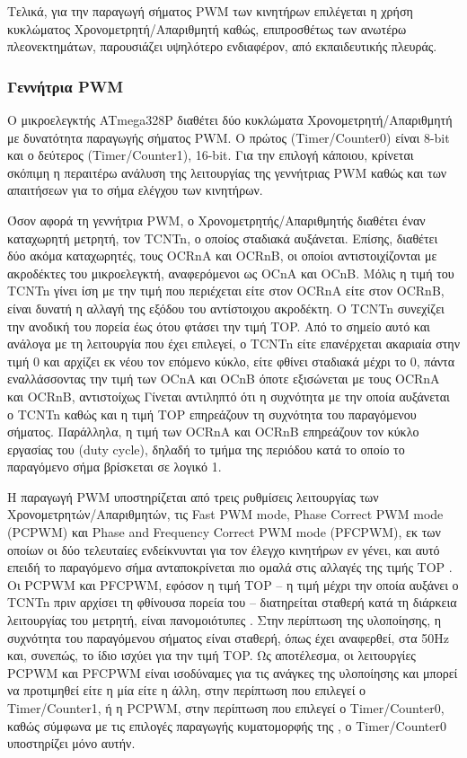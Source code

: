 Τελικά, για την παραγωγή σήματος PWM των κινητήρων επιλέγεται η χρήση κυκλώματος
Χρονομετρητή\slash Απαριθμητή καθώς, επιπροσθέτως των ανωτέρω πλεονεκτημάτων,
παρουσιάζει υψηλότερο ενδιαφέρον, από εκπαιδευτικής πλευράς.

\subsubsection{Γεννήτρια PWM}

Ο μικροελεγκτής ATmega328P διαθέτει δύο κυκλώματα Χρονομετρητή\slash Απαριθμητή
με δυνατότητα παραγωγής σήματος PWM. Ο πρώτος (Timer\slash Counter0) είναι 8-bit
και ο δεύτερος (Timer\slash Counter1), 16-bit. Για την επιλογή κάποιου, κρίνεται
σκόπιμη η περαιτέρω ανάλυση της λειτουργίας της γεννήτριας PWM καθώς και των
απαιτήσεων για το σήμα ελέγχου των κινητήρων.

Όσον αφορά τη γεννήτρια PWM, ο Χρονομετρητής\slash Απαριθμητής διαθέτει έναν
καταχωρητή μετρητή, τον TCNTn, ο οποίος σταδιακά αυξάνεται. Επίσης, διαθέτει
δύο ακόμα καταχωρητές, τους OCRnA και OCRnB, οι οποίοι αντιστοιχίζονται με
ακροδέκτες του μικροελεγκτή, αναφερόμενοι ως OCnA και OCnB. Μόλις η τιμή του
TCNTn γίνει ίση με την τιμή που περιέχεται είτε στον OCRnA είτε στον OCRnB,
είναι δυνατή η αλλαγή της εξόδου του αντίστοιχου ακροδέκτη. Ο TCNTn συνεχίζει
την ανοδική του πορεία έως ότου φτάσει την τιμή TOP. Από το σημείο αυτό και
ανάλογα με τη λειτουργία που έχει επιλεγεί, ο TCNTn είτε επανέρχεται ακαριαία
στην τιμή 0 και αρχίζει εκ νέου τον επόμενο κύκλο, είτε φθίνει σταδιακά μέχρι το
0, πάντα εναλλάσσοντας την τιμή των OCnA και OCnB όποτε εξισώνεται με τους OCRnA
και OCRnB, αντιστοίχως %
Γίνεται αντιληπτό ότι η συχνότητα με την οποία αυξάνεται ο TCNTn καθώς και η
τιμή TOP επηρεάζουν τη συχνότητα του παραγόμενου σήματος. Παράλληλα, η τιμή των
OCRnA και OCRnB επηρεάζουν τον κύκλο εργασίας του (\textenglish{duty cycle}),
δηλαδή το τμήμα της περιόδου κατά το οποίο το παραγόμενο σήμα βρίσκεται σε
λογικό 1.

Η παραγωγή PWM υποστηρίζεται από τρεις ρυθμίσεις λειτουργίας των
Χρονομετρητών\slash Απαριθμητών, τις \textenglish{Fast PWM mode, Phase Correct
PWM mode (PCPWM)} και \textenglish{Phase and Frequency Correct PWM mode
(PFCPWM)}, εκ των οποίων οι δύο τελευταίες ενδείκνυνται για τον έλεγχο κινητήρων
εν γένει, και αυτό επειδή το παραγόμενο σήμα ανταποκρίνεται πιο ομαλά στις
αλλαγές της τιμής TOP \parencite[126,128]{atmel13}. Οι PCPWM και PFCPWM, εφόσον
η τιμή TOP -- η τιμή μέχρι την οποία αυξάνει ο TCNTn πριν αρχίσει τη φθίνουσα
πορεία του -- διατηρείται σταθερή κατά τη διάρκεια λειτουργίας του μετρητή,
είναι πανομοιότυπες \parencite[127]{atmel13}. Στην περίπτωση της υλοποίησης, η
συχνότητα του παραγόμενου σήματος είναι σταθερή, όπως έχει αναφερθεί, στα 50Hz
και, συνεπώς, το ίδιο ισχύει για την τιμή TOP. Ως αποτέλεσμα, οι λειτουργίες
PCPWM και PFCPWM είναι ισοδύναμες για τις ανάγκες της υλοποίησης και μπορεί να
προτιμηθεί είτε η μία είτε η άλλη, στην περίπτωση που επιλεγεί ο Timer/Counter1,
ή η PCPWM, στην περίπτωση που επιλεγεί ο Timer/Counter0, καθώς σύμφωνα με τις
επιλογές παραγωγής κυματομορφής της \textcite[107]{atmel13}, ο Timer/Counter0
υποστηρίζει μόνο αυτήν.
